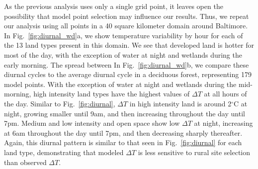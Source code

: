\documentclass[draft,linenumbers]{agujournal}
\begin{document}
As the previous analysis uses only a single grid point, it leaves open the possibility that model point selection may influence our results. Thus, we repeat our analysis using all points in a 40 square kilometer domain around Baltimore. In Fig.~\ref{fig:diurnal_wd}a, we show temperature variability by hour for each of the 13 land types present in this domain. We see that developed land is hotter for most of the day, with the exception of water at night and wetlands during the early morning. The spread between 
In Fig.~\ref{fig:diurnal_wd}b, we compare these diurnal cycles to the average diurnal cycle in a deciduous forest, representing 179 model points. With the exception of water at night and wetlands during the mid-morning, high intensity land types have the highest values of $\Delta T$ at all hours of the day. Similar to Fig.~\ref{fig:diurnal}, $\Delta T$ in high intensity land is around 2$^\circ$C at night, growing smaller until 9am, and then increasing throughout the day until 7pm. Medium and low intensity and open space show low $\Delta T$ at night, increasing at 6am throughout the day until 7pm, and then decreasing sharply thereafter. Again, this diurnal pattern is similar to that seen in Fig.~\ref{fig:diurnal} for each land type, demonstrating that modeled $\Delta T$ is less sensitive to rural site selection than observed $\Delta T$. 
 
\end{document}
